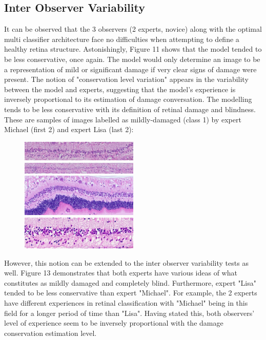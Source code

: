 \documentclass[a4paper]{article}
\begin{document}
    \subsection{Inter Observer Variability}
    It can be observed that the 3 observers (2 experts, novice) along with the optimal multi classifier architecture face no difficulties when attempting to define a healthy retina structure. Astonishingly, Figure 11 shows that the model tended to be less conservative, once again. The model would only determine an image to be a representation of mild or significant damage if very clear signs of damage were present. The notion of "conservation level variation" appears in the variability between the model and experts, suggesting that the model's experience is inversely proportional to its estimation of damage conversation. The modelling tends to be less conservative with its definition of retinal damage and blindness. These are samples of images labelled as mildly-damaged (class 1) by expert Michael (first 2) and expert Lisa (last 2):
    \begin{figure}[h!]
        \centerline{\includegraphics[width=0.5\textwidth]{../img/multi/lisa11.jpg}}
        \centerline{\includegraphics[width=0.5\textwidth]{../img/multi/lisa12.jpg}}
        \vspace{3mm}
        \centerline{\includegraphics[width=0.5\textwidth]{../img/multi/mich11.jpg}}
        \centerline{\includegraphics[width=0.5\textwidth]{../img/multi/mich12.jpg}}
    \end{figure}
    \vspace{3mm}

    However, this notion can be extended to the inter observer variability tests as well. Figure 13 demonstrates that both experts have various ideas of what constitutes as mildly damaged and completely blind. Furthermore, expert "Lisa" tended to be less conservative than expert "Michael". For example, the 2 experts have different experiences in retinal classification with "Michael" being in this field for a longer period of time than "Lisa". Having stated this, both observers' level of experience seem to be inversely proportional with the damage conservation estimation level.  
\end{document}
